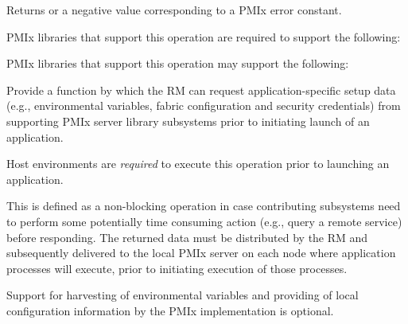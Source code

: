 Returns  or a negative value corresponding to a PMIx error constant.

\reqattrstart
\ac{PMIx} libraries that support this operation are required to support the following:


\reqattrend

\optattrstart
\ac{PMIx} libraries that support this operation may support the following:


\optattrend

\descr

Provide a function by which the \ac{RM} can request application-specific setup data (e.g., environmental variables, fabric configuration and security credentials) from supporting \ac{PMIx} server library subsystems prior to initiating launch of an application.

\advicermstart
Host environments are \textit{required} to execute this operation prior to launching an application.
\advicermend

This is defined as a non-blocking operation in case contributing subsystems need to perform some potentially time consuming action (e.g., query a remote service) before responding. The returned data must be distributed by the \ac{RM} and subsequently delivered to the local \ac{PMIx} server on each node where application processes will execute, prior to initiating execution of those processes.

\adviceimplstart
Support for harvesting of environmental variables and providing of local configuration information by the \ac{PMIx} implementation is optional.
\adviceimplend

\subsection{}

